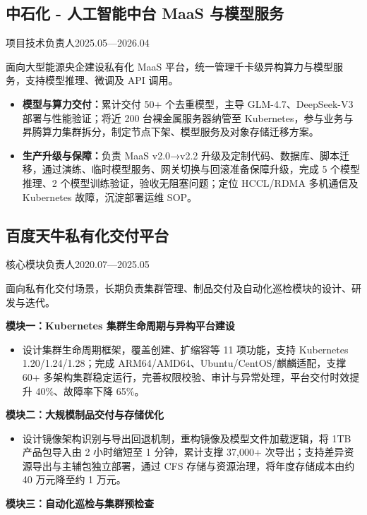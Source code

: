 \documentclass{resume}
\newcommand{\entry}[3]{%
  \subsection*{#1}%
  {\small\color{resumegray}#2\hfill #3\par}\nopagebreak[4]
}
\newcommand{\module}[1]{\par\vspace{5pt}\textbf{#1}\par\nopagebreak[4]}
\begin{document}
\entry{中石化 - 人工智能中台 MaaS 与模型服务}{项目技术负责人}{2025.05—2026.04}

面向大型能源央企建设私有化 MaaS 平台，统一管理千卡级异构算力与模型服务，支持模型推理、微调及 API 调用。\par

\begin{itemize}

  \item \textbf{模型与算力交付：}累计交付 50+ 个去重模型，主导 GLM-4.7、DeepSeek-V3 部署与性能验证；将近 200 台裸金属服务器纳管至 Kubernetes，参与业务与昇腾算力集群拆分，制定节点下架、模型服务及对象存储迁移方案。

  \item \textbf{生产升级与保障：}负责 MaaS v2.0→v2.2 升级及定制代码、数据库、脚本迁移，通过演练、临时模型服务、网关切换与回滚准备保障升级，完成 5 个模型推理、2 个模型训练验证，验收无阻塞问题；定位 HCCL/RDMA 多机通信及 Kubernetes 故障，沉淀部署运维 SOP。

\end{itemize}

\entry{百度天牛私有化交付平台}{核心模块负责人}{2020.07—2025.05}

面向私有化交付场景，长期负责集群管理、制品交付及自动化巡检模块的设计、研发与迭代。\par

\module{模块一：Kubernetes 集群生命周期与异构平台建设}

\begin{itemize}

  \item 设计集群生命周期框架，覆盖创建、扩缩容等 11 项功能，支持 Kubernetes 1.20/1.24/1.28；完成 ARM64/AMD64、Ubuntu/CentOS/麒麟适配，支撑 60+ 多架构集群稳定运行，完善权限校验、审计与异常处理，平台交付时效提升 40\%、故障率下降 65\%。

\end{itemize}

\module{模块二：大规模制品交付与存储优化}

\begin{itemize}

  \item 设计镜像架构识别与导出回退机制，重构镜像及模型文件加载逻辑，将 1TB 产品包导入由 2 小时缩短至 1 分钟，累计支撑 37,000+ 次导出；支持差异资源导出与主辅包独立部署，通过 CFS 存储与资源治理，将年度存储成本由约 40 万元降至约 1 万元。

\end{itemize}

\module{模块三：自动化巡检与集群预检查}
\end{document}
